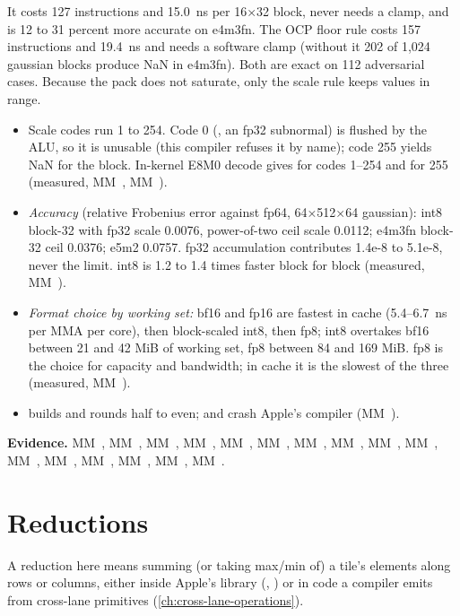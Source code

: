It costs 127 instructions and 15.0~ns per 16×32 block, never needs a clamp, and is 12 to 31 percent more accurate on
e4m3fn. The OCP floor rule costs 157 instructions and 19.4~ns and needs a software clamp (without it 202 of 1,024
gaussian blocks produce NaN in e4m3fn). Both are exact on 112 adversarial cases. Because the pack does not saturate,
only the scale rule keeps values in range.

\begin{itemize}
\item Scale codes run 1 to 254. Code 0 (, an fp32 subnormal) is flushed by the ALU, so it is unusable (this
  compiler refuses it by name); code 255 yields NaN for the block. In-kernel E8M0 decode
   gives  for codes 1–254 and  for 255 (measured, MM~,
  MM~).
\item \emph{Accuracy} (relative Frobenius error against fp64, 64×512×64 gaussian): int8 block-32 with fp32 scale 0.0076,
  power-of-two ceil scale 0.0112; e4m3fn block-32 ceil 0.0376; e5m2 0.0757. fp32 accumulation contributes 1.4e-8 to
  5.1e-8, never the limit. int8 is 1.2 to 1.4 times faster block for block (measured, MM~).
\item \emph{Format choice by working set:} bf16 and fp16 are fastest in cache (5.4–6.7~ns per MMA per core), then block-scaled
  int8, then fp8; int8 overtakes bf16 between 21 and 42 MiB of working set, fp8 between 84 and 169 MiB. fp8 is the
  choice for capacity and bandwidth; in cache it is the slowest of the three (measured, MM~).
\item {} builds and rounds half to even;  and  crash Apple's compiler (MM~).
\end{itemize}

\textbf{Evidence.} MM~, MM~, MM~, MM~, MM~, MM~, MM~, MM~, MM~, MM~, MM~, MM~,
MM~, MM~, MM~, MM~.

\section{Reductions}\label{sec:reductions}

A reduction here means summing (or taking max/min of) a tile's elements along rows or columns, either inside Apple's
library (, ) or in code a compiler emits from cross-lane primitives (\cref{ch:cross-lane-operations}).

